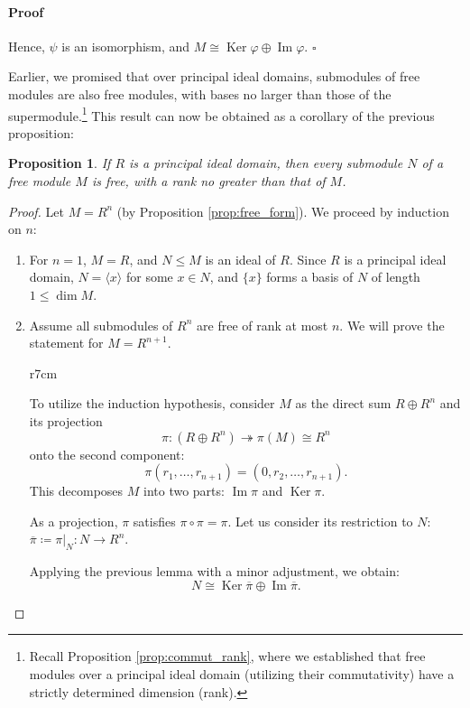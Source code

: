 \documentclass{article}
\newif\ifusemulticols
\newif\ifmobileview
\theoremstyle{definition}
\theoremstyle{remark}
\theoremstyle{plain}
\theoremstyle{plain}
\newtheorem{prop}[theorem]{Proposition}
\newenvironment{mymulticols}
    { \ifusemulticols \begin{multicols}{2} \fi }
    { \ifusemulticols \end{multicols} \fi }
\newcommand\mywrapbegin[3]{\ifmobileview\else\begin{wrapfigure}[#1]{#2}{#3}\fi}
\newcommand\mywrapend{\ifmobileview\else\end{wrapfigure}\fi}
\newenvironment{myproof}{\paragraph{Proof}}{\hfill$\square$}
\DeclareMathOperator{\Ker}{Ker}
\DeclareMathOperator{\image}{Im}
\begin{document}
\begin{mymulticols}
\begin{myproof}
    Hence, $\psi$ is an isomorphism, and $M \cong \Ker \varphi \oplus \image \varphi$.
\end{myproof}

Earlier, we promised that over principal ideal domains, submodules of free modules are also free modules, with bases no larger than those of the supermodule.\footnote{Recall Proposition \ref{prop:commut_rank}, where we established that free modules over a principal ideal domain (utilizing their commutativity) have a strictly determined dimension (rank).} 
This result can now be obtained as a corollary of the previous proposition:

\begin{prop}
    \label{prop:free_sub}
    If $R$ is a principal ideal domain, then every submodule $N$ of a free module $M$ is free, with
    a rank no greater than that of $M$.
\end{prop}

\begin{proof}
    Let $M = R^n$ (by Proposition \ref{prop:free_form}). We proceed by induction on $n$:
    \begin{enumerate}
        \item For $n = 1$, $M = R$, and $N \le M$ is an ideal of $R$. Since $R$ is a principal ideal
            domain, $N = \langle x \rangle$ for some $x \in N$, and $\{x\}$ forms a basis of $N$ of
            length $1 \le \dim M$.
        \item 
            Assume all submodules of $R^n$ are free of rank at most $n$. 
            We will prove the statement for $M = R^{n+1}$.

            \begin{minipage}[t]{\linewidth}
                \mywrapbegin{12}{r}{7cm}
                \mywrapend
                To utilize the induction hypothesis, consider $M$ as the direct sum $R \oplus R^n$
                and its projection 
                $$\pi: (R \oplus R^n) \twoheadrightarrow \pi(M) \cong R^n$$
                onto the second component: $$\pi(r_1, \ldots, r_{n+1}) = \left(0, r_2, \ldots, r_{n+1}\right).$$
                This decomposes $M$ into two parts: $\image \pi$ and $\Ker \pi$.

                As a projection, $\pi$ satisfies $\pi \circ \pi = \pi$. Let us consider its
                restriction to $N$: $\overline{\pi} \coloneqq \pi|_N : N \to R^n$.

                Applying the previous lemma with a minor adjustment\footnotemark, we
                obtain: $$N \cong \Ker \overline{\pi} \oplus \image \overline{\pi}.$$
            \end{minipage}


\end{enumerate}
\end{proof}
\end{mymulticols}
\end{document}

